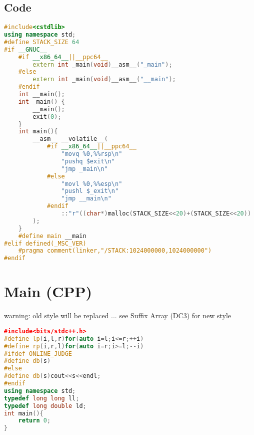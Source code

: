 \documentclass{book}
\begin{document}
\subsection*{Code}
\begin{lstlisting}[language=C++,title={Large Stack.hpp (845 bytes, 32 lines)}]
#include<cstdlib>
using namespace std;
#define STACK_SIZE 64
#if __GNUC__
    #if __x86_64__||__ppc64__
        extern int _main(void)__asm__("_main");
    #else
        extern int _main(void)__asm__("__main");
    #endif
    int __main();
    int _main() {
        __main();
        exit(0);
    }
    int main(){
        __asm__ __volatile__(
            #if __x86_64__||__ppc64__
                "movq %0,%%rsp\n"
                "pushq $exit\n"
                "jmp _main\n"
            #else
                "movl %0,%%esp\n"
                "pushl $_exit\n"
                "jmp __main\n"
            #endif
                ::"r"((char*)malloc(STACK_SIZE<<20)+(STACK_SIZE<<20))
        );
    }
    #define main __main
#elif defined(_MSC_VER)
    #pragma comment(linker,"/STACK:1024000000,1024000000")
#endif\end{lstlisting}
\section{Main (CPP)}
warning: old style will be replaced ... see Suffix Array (DC3) for new style\begin{lstlisting}[language=C++,title={Main (CPP).hpp (287 bytes, 14 lines)}]
﻿#include<bits/stdc++.h>
#define lp(i,l,r)for(auto i=l;i<=r;++i)
#define rp(i,r,l)for(auto i=r;i>=l;--i)
#ifdef ONLINE_JUDGE
#define db(s)
#else
#define db(s)cout<<s<<endl;
#endif
using namespace std;
typedef long long ll;
typedef long double ld;
int main(){
    return 0;
}\end{lstlisting}
\end{document}
